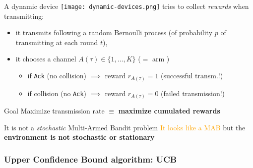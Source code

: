 \begin{frameO}

    A dynamic device \texttt{[image: dynamic-devices.png]}  tries to collect \emph{rewards} when transmitting:

    \begin{itemize}
        \item
            it transmits following a random Bernoulli process \newline
            (of probability \(p\) of transmitting at each round \(t\)),
        \item
            it chooses a channel \(A(\tau) \in \{1,\dots,K\}\)
            \hfill{} ($=$ arm \slotmachine)
        \begin{itemize}
        \item
            if \texttt{Ack} (no collision) \hspace*{2pt} \(\implies\) reward
            \(r_{A(\tau)} = 1\) \hfill{} (successful transm.!)
        \item
            if collision (no \texttt{Ack}) \hspace*{2pt} \(\implies\) reward
            \(r_{A(\tau)} = 0\) \hfill{} (failed transmission!)
        \end{itemize}

    \end{itemize}

    \pause

    \begin{colorblock}{Goal}
        Maximize transmission rate \(\equiv\) \textbf{maximize cumulated rewards}
    \end{colorblock}

    \begin{lightblock}{It is not a \emph{stochastic} Multi-Armed Bandit problem}
        \textcolor{orange}{It looks like a MAB}
        but the \textbf{environment is not stochastic or stationary}
    \end{lightblock}

\end{frameO}

\subsubsection{Upper Confidence Bound algorithm: UCB}


